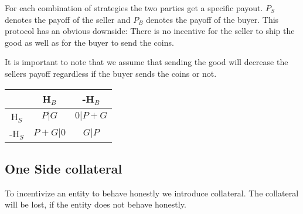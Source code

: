 \documentclass{cacthesis}
\begin{document}
For each combination of strategies the two parties get a specific payout. $P_S$ denotes the payoff of the seller and $P_B$ denotes the payoff of the buyer.
\newline
This protocol has an obvious downside: There is no incentive for the seller to ship the good as well as for the buyer to send the coins. \newline

It is important to note that we assume that sending the good will decrease the sellers payoff regardless if the buyer sends the coins or not.


\begin{center}
\begin{tabular}{ c||c|c| }
& H$_B$ & -H$_B$  \\
\hline
\hline
H$_S$ & $P | G$ & $0 | P+G$ \\
\hline
-H$_S$ & $P + G | 0$ & $G | P$ \\ 
\hline
\end{tabular}
\end{center}

\subsection{One Side collateral}
To incentivize an entity to behave honestly we introduce collateral. The collateral will be lost, if the entity does not behave honestly.
\end{document}
